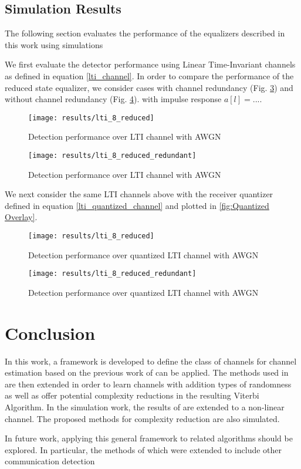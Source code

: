 \subsection{Simulation Results}
The following section evaluates the performance of the equalizers described in this work using simulations
\par
We first evaluate the detector performance using Linear Time-Invariant channels as defined in equation \eqref{lti_channel}. In order to compare the performance of the reduced state equalizer, we consider cases with channel redundancy (Fig. \ref{fig:LTI performance}) and without channel redundancy (Fig. \ref{fig:LTI performance redundant}). 
with impulse response $a[l] = ...$.
\begin{figure}[H]
	\texttt{[image: results/lti\_8\_reduced]}
		  \caption{Detection performance over LTI channel with AWGN}
	  \label{fig:LTI performance}
\end{figure}
\begin{figure}[H]
	\texttt{[image: results/lti\_8\_reduced\_redundant]}
		  \caption{Detection performance over LTI channel with AWGN}
	  \label{fig:LTI performance redundant}
\end{figure}

\par
We next consider the same LTI channels above with the receiver quantizer defined in equation \eqref{lti_quantized_channel} and plotted in \ref{fig:Quantized Overlay}.

\begin{figure}[H]
	\texttt{[image: results/lti\_8\_reduced]}
		  \caption{Detection performance over quantized LTI channel with AWGN}
	  \label{fig:LTI performance}
\end{figure}
\begin{figure}[H]
	\texttt{[image: results/lti\_8\_reduced\_redundant]}
		  \caption{Detection performance over quantized LTI channel with AWGN}
	  \label{fig:LTI performance redundant}
\end{figure}


\section{Conclusion}
In this work, a framework is developed to define the class of channels for channel estimation based on the previous work of \cite{shlezinger2019viterbinet} can be applied. The methods used in \cite{shlezinger2019viterbinet} are then extended in order to learn channels with addition types of randomness as well as offer potential complexity reductions in the resulting Viterbi Algorithm. 
 In the simulation work, the results of \cite{shlezinger2019viterbinet} are extended to a non-linear channel. The proposed methods for complexity reduction are also simulated.
 \par 
 In future work, applying this general framework to related algorithms should be explored. In particular, the methods of \cite{shlezinger2019viterbinet} which were extended to include other communication detection 

